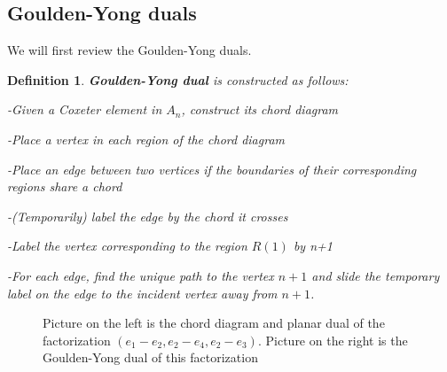 \documentclass[11pt]{amsart}
\newtheorem{defi}[thm]{Definition}%
\begin{document}
\subsection{Goulden-Yong duals}

We will first review the Goulden-Yong duals.

\begin{defi}\cite{MR1897927}
    \textbf{Goulden-Yong dual} is constructed as follows:
    
    -Given a Coxeter element in $A_n$, construct its chord diagram

    -Place a vertex in each region of the chord diagram
    
    -Place an edge between two vertices if the boundaries of their corresponding regions share a chord

    -(Temporarily) label the edge by the chord it crosses

    -Label the vertex corresponding to the region $R(1)$ by n+1

    -For each edge, find the unique path to the vertex $n+1$ and slide the temporary label on the edge to the incident vertex away from $n+1$.
\end{defi}

\begin{figure}
    \centering
    \caption{Picture on the left is the chord diagram and planar dual of the factorization $(e_1-e_2,e_2-e_4,e_2-e_3)$. Picture on the right is the Goulden-Yong dual of this factorization}
\end{figure}
\end{document}
